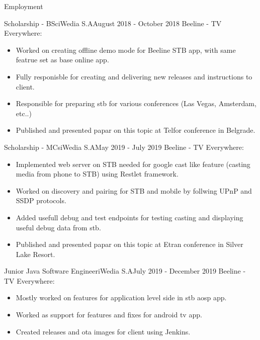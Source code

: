 \documentclass[]{mcdowellcv}
\begin{document}
	\makeheader

	\begin{cvsection}{Employment}
		\begin{cvsubsection}{Scholarship - BSc}{iWedia S.A}{August 2018 - October 2018}
			Beeline - TV Everywhere:
			\begin{itemize}
				\item Worked on creating offline demo mode for Beeline STB app, with same featrue set as base online app.
				\item Fully responisble for creating and delivering new releases and instructions to client.
				\item Responsible for preparing stb for various conferences (Las Vegas, Amsterdam, etc..)
				\item Published and presented papar on this topic at Telfor conference in Belgrade.
			\end{itemize}
		\end{cvsubsection}

		\begin{cvsubsection}{Scholarship - MCs}{iWedia S.A}{May 2019 - July 2019}
			Beeline - TV Everywhere:
			\begin{itemize}
				\item Implemented web server on STB needed for google cast like feature (casting media from phone to STB) using Restlet framework.
				\item Worked on discovery and pairing for STB and mobile by follwing UPnP and SSDP protocols.
				\item Added usefull debug and test endpoints for testing casting and displaying useful debug data from stb.
				\item Published and presented papar on this topic at Etran conference in Silver Lake Resort.
			\end{itemize}
		\end{cvsubsection}

		\begin{cvsubsection}{Junior Java Software Engineer}{iWedia S.A}{July 2019 - December 2019}
			Beeline - TV Everywhere:
			\begin{itemize}
				\item Mostly worked on features for application level side in stb aosp app.
				\item Worked as support for features and fixes for android tv app.
				\item Created releases and ota images for client using Jenkins.
			\end{itemize}
		\end{cvsubsection}


\end{cvsection}
\end{document}
